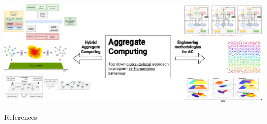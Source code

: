 \documentclass[presentation, 9pt,169]{beamer}\mode<presentation>{\usetheme{AMSBolognaFC}}
\begin{document}
\begin{frame}
\includegraphics[width=\textwidth]{img/contribution.drawio.png}
\end{frame}
\begin{frame}[allowframebreaks]{References}
  \def\bibfont{\footnotesize}
  \printbibliography
\end{frame}

\end{document}
